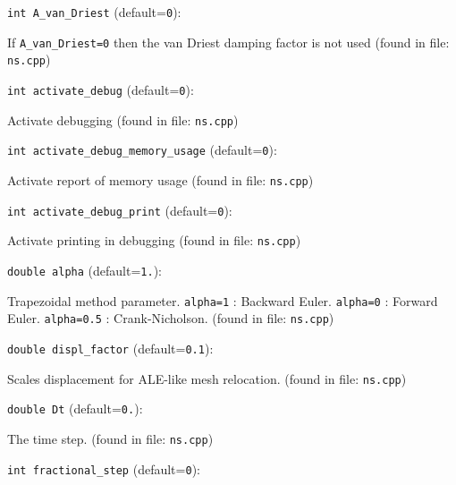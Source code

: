 \item\verb+int A_van_Driest+ {\rm(default=\verb|0|)}:

If {\tt A\_van\_Driest=0} then the van Driest
   damping factor is not used 
 (found in file: \verb+ns.cpp+)
\item\verb+int activate_debug+ {\rm(default=\verb|0|)}:

Activate debugging
 (found in file: \verb+ns.cpp+)
\item\verb+int activate_debug_memory_usage+ {\rm(default=\verb|0|)}:

Activate report of memory usage
 (found in file: \verb+ns.cpp+)
\item\verb+int activate_debug_print+ {\rm(default=\verb|0|)}:

Activate printing in debugging
 (found in file: \verb+ns.cpp+)
\item\verb+double alpha+ {\rm(default=\verb|1.|)}:

Trapezoidal method parameter.  \verb+alpha=1+ :
Backward Euler.  \verb+alpha=0+ : Forward Euler.
 \verb+alpha=0.5+ : Crank-Nicholson. 
 (found in file: \verb+ns.cpp+)
\item\verb+double displ_factor+ {\rm(default=\verb|0.1|)}:

Scales displacement for ALE-like mesh relocation. 
 (found in file: \verb+ns.cpp+)
\item\verb+double Dt+ {\rm(default=\verb|0.|)}:

The time step.
 (found in file: \verb+ns.cpp+)
\item\verb+int fractional_step+ {\rm(default=\verb|0|)}:

